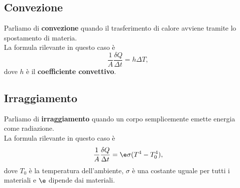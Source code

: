 \subsection{Convezione}
Parliamo di \textbf{convezione} quando il trasferimento di calore avviene tramite lo spostamento di materia.\\ La formula rilevante in questo caso \`e
\[\frac1A\frac{\delta Q}{\Delta t}=h\Delta T,\]
dove $h$ \`e il \textbf{coefficiente convettivo}.

\subsection{Irraggiamento}
Parliamo di \textbf{irraggiamento} quando un corpo semplicemente emette energia come radiazione.\\ 
La formula rilevante in questo caso \`e
\[\frac1A\frac{\delta Q}{\Delta t}=\e \sigma(T^4-T_0^4),\]
dove $T_0$ \`e la temperatura dell'ambiente, $\sigma$ \`e una costante uguale per tutti i materiali e $\e$ dipende dai materiali.

